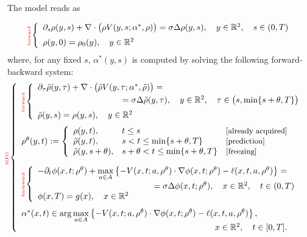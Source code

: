 \documentclass{cmslatex}
\newcommand{\R}{\mathbb{R}}
\newcommand{\alphastar}{\alpha^*}
\newcommand{\rtheta}{\rho^\theta}
\renewcommand{\r}{\rho}
\begin{document}
\newpage %
The model reads as
\begin{tcolorbox}[colback=blue!5!white]
\begin{equation}\label{model:main_forward}
\rotatebox[origin=c]{90}{\tiny \text{\textcolor{red}{forward}}}
\left\{\begin{array}{l}
\partial_s \r(y,s)  + \nabla\cdot \big(\r V(y,s;\alphastar,\r)\big) = \sigma\Delta\r(y,s),\quad y\in\R^2, \quad s\in(0,T) \\ [2mm]
\r(y,0)=\r_0(y),\quad y\in\R^2
\end{array}\right. 
\end{equation}
%
where, for any fixed $s$, $\alphastar(y,s)$ is computed by solving the following forward-backward system:
%
\begin{equation}\label{model:mfg}
\hspace{-0.3cm}
\rotatebox[origin=c]{90}{\tiny \text{\textcolor{red}{MFG}}}
\left\{
\begin{array}{l}
\rotatebox[origin=c]{90}{\tiny \text{\textcolor{red}{forward}}}
\left\{\begin{array}{l}
\partial_\tau \tilde \r(y,\tau)  + \nabla\cdot \big(\tilde \r V(y,\tau;\alphastar,\tilde \r)\big) = \\ [1mm]
\hspace{3.5cm}=\sigma\Delta\tilde \r(y,\tau),\quad y\in\R^2, \quad \tau\in\big(s,\min\{s+\theta,T\}\big) 
\\ [2mm]
\tilde \r(y,s)=\r(y,s),\quad y\in\R^2
\end{array}\right. 
\\ [8mm]
\rtheta(y,t):=
\left\{
\begin{array}{lll}
\r(y,t), & t\leq s & \text{\small[already acquired]}\\
\tilde \r(y,t), & s< t \leq \min\{s+\theta,T\} & \text{\small[prediction]}\\
\tilde \r(y,s+\theta), &  s+\theta<t\leq \min\{s+\theta,T\} & \text{\small [freezing]}
\end{array}
\right.
\\ [8mm]
\rotatebox[origin=c]{90}{\tiny \text{\textcolor{red}{backward}}}
\left\{\begin{array}{l}
-\partial_t\phi(x,t;\rtheta) + \max\limits_{a\in A}\left\{-V(x,t;a,\rtheta)\cdot\nabla\phi(x,t;\rtheta)-\ell(x,t,a,\rtheta)\right\}=\\ [2mm] \hspace{4.8cm} 
=\sigma\Delta\phi(x,t;\rtheta),\quad x\in\R^2, \quad t\in (0,T) \\ [0mm]
\phi(x,T)=g(x),\quad x\in\R^2
\end{array}\right.
\\ [8mm]
\alphastar(x,t)\in\arg\max\limits_{a\in A} \left\{-V(x,t;a,\rtheta)\cdot\nabla\phi(x,t;\rtheta)-\ell(x,t,a,\rtheta)\right\},  \\ \hspace{8cm} 
x\in\R^2,\quad t\in[0,T].
\end{array}
\right.
\end{equation}
\end{tcolorbox}
\end{document}
